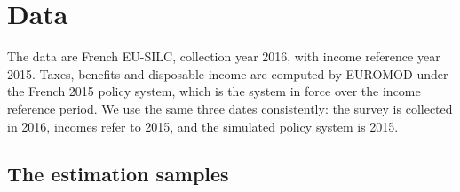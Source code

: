 \section{Data}\label{data}

The data are French EU-SILC, collection year 2016, with income reference year 2015. Taxes, benefits and disposable income are computed by EUROMOD \citep{sutherlandfigari2013} under the French 2015 policy system, which is the system in force over the income reference period. We use the same three dates consistently: the survey is collected in 2016, incomes refer to 2015, and the simulated policy system is 2015.

\subsection{The estimation samples}\label{the-estimation-samples}

